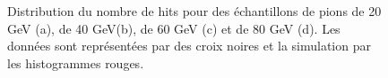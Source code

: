 \begin{figure}[!ht]
  \caption{Distribution du nombre de hits pour des échantillons de pions de 20 GeV (a), de 40 GeV(b), de 60 GeV (c) et de 80 GeV (d). Les données sont représentées par des croix noires et la simulation par les histogrammes rouges.\label{fig.pi-nhit}}
\end{figure}

